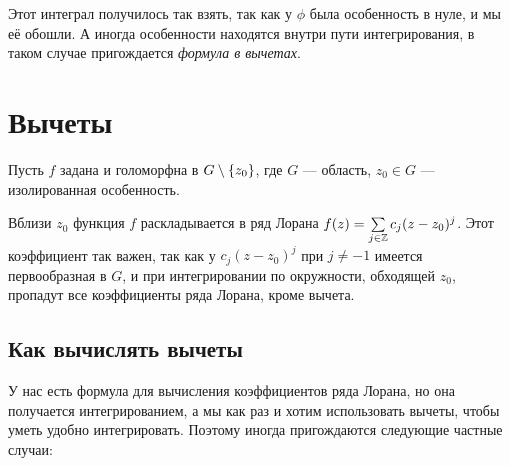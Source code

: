 \documentclass[a4paper]{report}
\begin{document}
    Этот интеграл получилось так взять, так как у $\phi$ была особенность в нуле, и мы её обошли.
    А иногда особенности находятся внутри пути интегрирования, в таком случае пригождается \emph{формула в вычетах}.
    \section{Вычеты}
    Пусть $f$ задана и голоморфна в $G \setminus \{z_0\}$, где $G$ --- область, $z_0 \in G$ --- изолированная особенность.

    Вблизи $z_0$ функция $f$ раскладывается в ряд Лорана $f(z) = \sum\limits_{j \in \mathbb{Z}}c_j (z - z_0)^j$.
    Этот коэффициент так важен, так как у $c_j (z - z_0)^j$ при $j \ne -1$ имеется первообразная в $G$, и при интегрировании по окружности, обходящей $z_0$, пропадут все коэффициенты ряда Лорана, кроме вычета.
    \subsection{Как вычислять вычеты}
    У нас есть формула для вычисления коэффициентов ряда Лорана, но она получается интегрированием, а мы как раз и хотим использовать вычеты, чтобы уметь удобно интегрировать.
    Поэтому иногда пригождаются следующие частные случаи:
\end{document}
